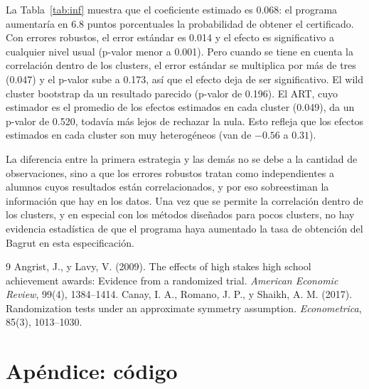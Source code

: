 \documentclass[11pt,a4paper]{article}
\begin{document}
La Tabla~\ref{tab:inf} muestra que el coeficiente estimado es 0.068: el programa aumentaría en 6.8 puntos porcentuales la probabilidad de obtener el certificado. Con errores robustos, el error estándar es 0.014 y el efecto es significativo a cualquier nivel usual (p-valor menor a 0.001). Pero cuando se tiene en cuenta la correlación dentro de los clusters, el error estándar se multiplica por más de tres (0.047) y el p-valor sube a 0.173, así que el efecto deja de ser significativo. El wild cluster bootstrap da un resultado parecido (p-valor de 0.196). El ART, cuyo estimador es el promedio de los efectos estimados en cada cluster (0.049), da un p-valor de 0.520, todavía más lejos de rechazar la nula. Esto refleja que los efectos estimados en cada cluster son muy heterogéneos (van de $-0.56$ a $0.31$).

La diferencia entre la primera estrategia y las demás no se debe a la cantidad de observaciones, sino a que los errores robustos tratan como independientes a alumnos cuyos resultados están correlacionados, y por eso sobreestiman la información que hay en los datos. Una vez que se permite la correlación dentro de los clusters, y en especial con los métodos diseñados para pocos clusters, no hay evidencia estadística de que el programa haya aumentado la tasa de obtención del Bagrut en esta especificación.

\begin{thebibliography}{9}
 Angrist, J., y Lavy, V. (2009). The effects of high stakes high school achievement awards: Evidence from a randomized trial. \textit{American Economic Review}, 99(4), 1384--1414.
 Canay, I. A., Romano, J. P., y Shaikh, A. M. (2017). Randomization tests under an approximate symmetry assumption. \textit{Econometrica}, 85(3), 1013--1030.
\end{thebibliography}

\newpage
\appendix
\section*{Apéndice: código}

\end{document}
